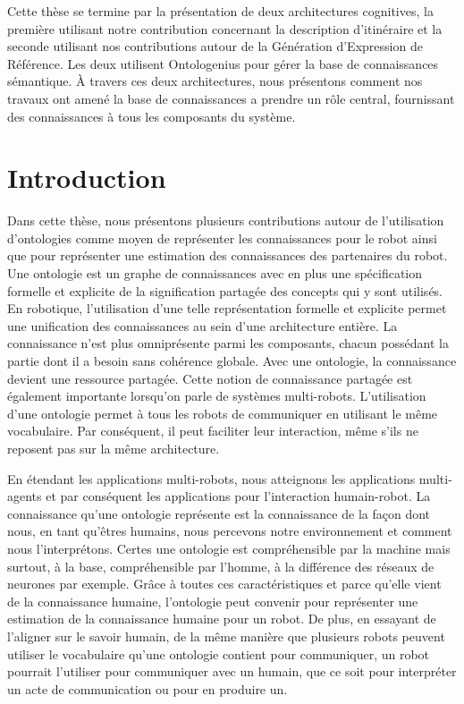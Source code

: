 Cette thèse se termine par la présentation de deux architectures cognitives, la première utilisant notre contribution concernant la description d’itinéraire et la seconde utilisant nos contributions autour de la Génération d’Expression de Référence. Les deux utilisent Ontologenius pour gérer la base de connaissances sémantique. À travers ces deux architectures, nous présentons comment nos travaux ont amené la base de connaissances a prendre un rôle central, fournissant des connaissances à tous les composants du système. 

\section*{Introduction}

Dans cette thèse, nous présentons plusieurs contributions autour de l'utilisation d'ontologies comme moyen de représenter les connaissances pour le robot ainsi que pour représenter une estimation des connaissances des partenaires du robot. Une ontologie est un graphe de connaissances avec en plus une spécification formelle et explicite de la signification partagée des concepts qui y sont utilisés. En robotique, l'utilisation d'une telle représentation formelle et explicite permet une unification des connaissances au sein d'une architecture entière. La connaissance n'est plus omniprésente parmi les composants, chacun possédant la partie dont il a besoin sans cohérence globale. Avec une ontologie, la connaissance devient une ressource partagée. Cette notion de connaissance partagée est également importante lorsqu'on parle de systèmes multi-robots. L'utilisation d'une ontologie permet à tous les robots de communiquer en utilisant le même vocabulaire. Par conséquent, il peut faciliter leur interaction, même s'ils ne reposent pas sur la même architecture.

En étendant les applications multi-robots, nous atteignons les applications multi-agents et par conséquent les applications pour l'interaction humain-robot. La connaissance qu'une ontologie représente est la connaissance de la façon dont nous, en tant qu'êtres humains, nous percevons notre environnement et comment nous l'interprétons. Certes une ontologie est compréhensible par la machine mais surtout, à la base, compréhensible par l'homme, à la différence des réseaux de neurones par exemple. Grâce à toutes ces caractéristiques et parce qu'elle vient de la connaissance humaine, l'ontologie peut convenir pour représenter une estimation de la connaissance humaine pour un robot. De plus, en essayant de l'aligner sur le savoir humain, de la même manière que plusieurs robots peuvent utiliser le vocabulaire qu'une ontologie contient pour communiquer, un robot pourrait l'utiliser pour communiquer avec un humain, que ce soit pour interpréter un acte de communication ou pour en produire un. 

